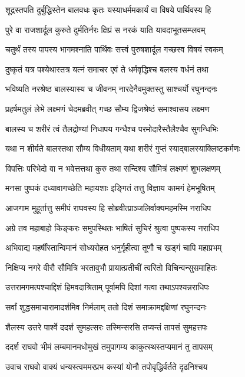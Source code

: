 \twolineshloka
{शूद्रस्तपति दुर्बुद्धिस्तेन बालवधः कृतः}
{यस्याधर्ममकार्यं वा विषये पार्थिवस्य हि}%

\twolineshloka
{पुरे वा राजशार्दूल कुरुते दुर्मतिर्नरः}
{क्षिप्रं स नरकं याति यावदाभूतसम्प्लवम्}%

\twolineshloka
{चतुर्थं तस्य पापस्य भागमश्नाति पार्थिवः}
{सत्त्वं पुरुषशार्दूल गच्छस्व विषयं स्वकम्}%

\twolineshloka
{दुष्कृतं यत्र पश्येथास्तत्र यत्नं समाचर}
{एवं ते धर्मवृद्धिश्च बलस्य वर्धनं तथा}%

\twolineshloka
{भविष्यति नरश्रेष्ठ बालस्यास्य च जीवनम्}
{नारदेनैवमुक्तस्तु साश्चर्यो रघुनन्दनः}%

\twolineshloka
{प्रहर्षमतुलं लेभे लक्ष्मणं चेदमब्रवीत्}
{गच्छ सौम्य द्विजश्रेष्ठं समाश्वासय लक्ष्मण}%

\twolineshloka
{बालस्य च शरीरं त्वं तैलद्रोण्यां निधापय}
{गन्धैश्च परमोदारैस्तैलैश्चैव सुगन्धिभिः}%

\twolineshloka
{यथा न शीर्यते बालस्तथा सौम्य विधीयताम्}
{यथा शरीरं गुप्तं स्याद्बालस्याक्लिष्टकर्मणः}%

\twolineshloka
{विपत्तिः परिभेदो वा न भवेत्तत्तथा कुरु}
{तथा सन्दिश्य सौमित्रं लक्ष्मणं शुभलक्षणम्}%

\twolineshloka
{मनसा पुष्पकं दध्यावागच्छेति महायशाः}
{इङ्गितं तत्तु विज्ञाय कामगं हेमभूषितम्}%

\twolineshloka
{आजगाम मुहूर्तात्तु समीपं राघवस्य हि}
{सोब्रवीत्प्राञ्जलिर्वाक्यमहमस्मि नराधिप}%

\twolineshloka
{अग्रे तव महाबाहो किङ्करः समुपस्थितः}
{भाषितं सुचिरं श्रुत्वा पुष्पकस्य नराधिप}%

\twolineshloka
{अभिवाद्य महर्षींस्तान्विमानं सोध्यरोहत}
{धनुर्गृहीत्वा तूणौ च खड्गं चापि महाप्रभम्}%

\twolineshloka
{निक्षिप्य नगरे वीरौ सौमित्रि भरतावुभौ}
{प्रायात्प्रतीचीं त्वरितो विचिन्वन्सुसमाहितः}%

\twolineshloka
{उत्तरामगमत्पश्चाद्दिशं हिमवदाश्रिताम्}
{पूर्वामपि दिशां गत्वा तथाऽपश्यन्नराधिपः}%

\twolineshloka
{सर्वां शुद्धसमाचारामादर्शमिव निर्मलाम्}
{ततो दिशं समाक्रामद्दक्षिणां रघुनन्दनः}%

\twolineshloka
{शैलस्य उत्तरे पार्श्वे ददर्श सुमहत्सरः}
{तस्मिन्सरसि तप्यन्तं तापसं सुमहत्तपः}%

\twolineshloka
{ददर्श राघवो भीमं लम्बमानमधोमुखं}
{तमुपागम्य काकुत्स्थस्तप्यमानं तु तापसम्}%

\twolineshloka
{उवाच राघवो वाक्यं धन्यस्त्वममरप्रभ}
{कस्यां योनौ तपोवृद्धिर्वर्तते दृढनिश्चय}%


